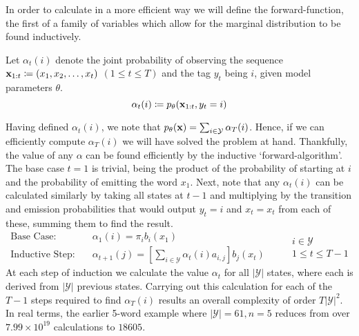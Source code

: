 \documentclass[../main.tex]{subfiles}
\begin{document}
In order to calculate in a more efficient way we will define the forward-function, the first of a family of variables which allow for the marginal distribution to be found inductively.
\begin{definition} \label{def:forward-func}
    Let $\alpha_t(i)$ denote the joint probability of observing the sequence $\mathbf{x}_{1:t} \coloneqq (x_1,x_2,\ldots,x_t)$ $(1 \leq t \leq T)$ and the tag $y_t$ being $i$, given model parameters $\theta$.
    \begin{equation*}
        \alpha_t(i) \coloneqq p_\theta(\mathbf{x}_{1:t},y_t=i)
    \end{equation*}
\end{definition}
Having defined $\alpha_t(i)$, we note that $p_\theta(\mathbf{x}) = \sum_{i \in \mathcal{Y}} \alpha_T(i)$.
Hence, if we can efficiently compute $\alpha_T(i)$ we will have solved the problem at hand.
Thankfully, the value of any $\alpha$ can be found efficiently by the inductive `forward-algorithm'. The base case $t=1$ is trivial, being the product of the probability of starting at $i$ and the probability of emitting the word $x_1$. Next, note that any $\alpha_t(i)$ can be calculated similarly by taking all states at $t-1$ and multiplying by the transition and emission probabilities that would output $y_{t}=i$ and $x_{t} = x_t$ from each of these, summing them to find the result.
\begin{equation*}
    \begin{aligned}
        \text{Base Case:} & \quad \alpha_1(i) = \pi_{i} b_i(x_1) \\
        \text{Inductive Step:} & \quad \alpha_{t+1}(j) = \left[ \sum_{i \in \mathcal{Y}} \alpha_{t}(i)a_{i,j} \right] b_j(x_t)
    \end{aligned} \qquad 
        \begin{array}{lr}
            i \in \mathcal{Y} \\
            1 \leq t \leq T-1
        \end{array}
\end{equation*}
At each step of induction we calculate the value $\alpha_t$ for all $|\mathcal{Y}|$ states, where each is derived from $|\mathcal{Y}|$ previous states.
Carrying out this calculation for each of the $T-1$ steps required to find $\alpha_T(i)$ results an overall complexity of order $T|\mathcal{Y}|^2$.
In real terms, the earlier 5-word example where $|\mathcal{Y}|=61,n=5$ reduces from over $7.99 \times 10^{19}$ calculations to $18605$.
\end{document}
